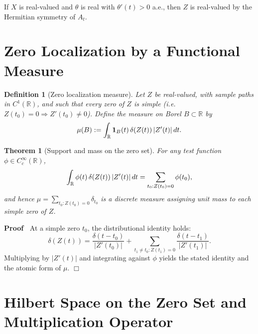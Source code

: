 \documentclass{article}
\newcommand{\assign}{:=}
\newenvironment{proof}{\noindent\textbf{Proof\ }}{\hspace*{\fill}$\Box$\medskip}
\newtheorem{definition}{Definition}
\newtheorem{theorem}{Theorem}
\begin{document}
\begin{remark}
   If $X$ is real-valued and $\theta$ is
  real with $\theta' (t) > 0$ a.e., then $Z$ is real-valued by the Hermitian
  symmetry of $A_t$.
\end{remark}

\section{Zero Localization by a Functional Measure}

\begin{definition}
  [Zero localization measure] Let $Z$ be real-valued, with sample paths in
  $C^1 (\mathbb{R})$, and such that every zero of $Z$ is simple (i.e. $Z (t_0)
  = 0 \Longrightarrow Z' (t_0) \neq 0$). Define the measure on Borel $B
  \subset \mathbb{R}$ by
  \begin{equation}
    \mu (B) \assign \int_{\mathbb{R}} \textbf{1}_B (t)  \hspace{0.17em} \delta
    (Z (t)) \hspace{0.17em} |Z' (t) |  \hspace{0.17em} dt.
  \end{equation}
\end{definition}

\begin{theorem}
  [Support and mass on the zero set] For any test function $\phi \in
  C_c^{\infty} (\mathbb{R})$,
  \begin{equation}
    \int_{\mathbb{R}} \phi (t)  \hspace{0.17em} \delta (Z (t)) \hspace{0.17em}
    |Z' (t) |  \hspace{0.17em} dt = \sum_{t_0 : Z (t_0) = 0} \phi (t_0),
  \end{equation}
  and hence $\mu = \sum_{t_0 : Z (t_0) = 0} \delta_{t_0}$ is a discrete
  measure assigning unit mass to each simple zero of $Z$.
\end{theorem}

\begin{proof}
  At a simple zero $t_0$, the distributional identity holds:
  \[ \delta (Z (t)) = \frac{\delta (t - t_0)}{|Z' (t_0) |} + \sum_{t_1 \neq
     t_0 : Z (t_1) = 0} \frac{\delta (t - t_1)}{|Z' (t_1) |} . \]
  Multiplying by $|Z' (t) |$ and integrating against $\phi$ yields the stated
  identity and the atomic form of $\mu$.
\end{proof}

\section{Hilbert Space on the Zero Set and Multiplication Operator}
\end{document}
